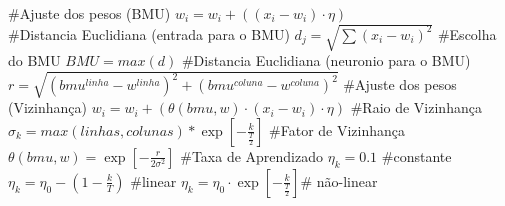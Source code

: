 #Ajuste dos pesos (BMU)
\( w_i = w_i + ( (x_i - w_i) \cdot \eta) \) \\
#Distancia Euclidiana (entrada para o BMU)
\( d_j = \sqrt{\sum (x_{i} - w_{i})^2} \)
#Escolha do BMU
\( BMU = max(d) \)
#Distancia Euclidiana (neuronio para o BMU)
\( r = \sqrt{(bmu^{linha} - w^{linha})^2 + (bmu^{coluna} - w^{coluna})^2} \)
#Ajuste dos pesos (Vizinhança)
\( w_i = w_i + ( \theta(bmu,w) \cdot (x_i - w_i) \cdot \eta) \) 
#Raio de Vizinhança
\( \sigma_k = max(linhas,colunas) * \exp [-\frac{k}{\frac{T}{2}}] \)
#Fator de Vizinhança
\( \theta(bmu,w) = \exp [-\frac{r}{2\sigma^2}]\)
#Taxa de Aprendizado
\( \eta_k = 0.1 \) #constante
\( \eta_k = \eta_0 - (1 - \frac{k}{T}) \) #linear
\( \eta_k = \eta_0 \cdot \exp [-\frac{k}{\frac{T}{2}}] \)# não-linear